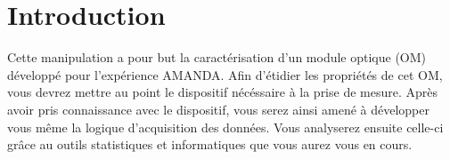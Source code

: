 \section{Introduction}

Cette manipulation a pour but la caract\'erisation d'un module optique (OM) développé pour l'expérience AMANDA. Afin d'étidier les propriétés de cet OM, vous devrez mettre au point le dispositif nécéssaire à la prise de mesure. Après avoir pris connaissance avec le dispositif, vous serez ainsi amené à développer vous même la logique d'acquisition des données. Vous analyserez ensuite celle-ci grâce au outils statistiques et informatiques que vous aurez vous en cours. 

\pagebreak
